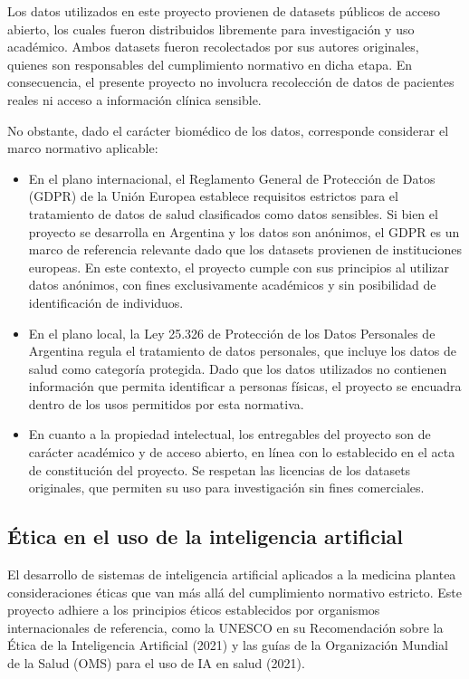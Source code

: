 \documentclass[
11pt, %
]{charter}
\begin{document}
Los datos utilizados en este proyecto provienen de datasets públicos de acceso abierto, los cuales fueron distribuidos libremente 
para investigación y uso académico. Ambos datasets fueron recolectados por sus autores originales, quienes son responsables del cumplimiento normativo en 
dicha etapa. En consecuencia, el presente proyecto no involucra recolección de datos de pacientes reales ni acceso a información 
clínica sensible.

No obstante, dado el carácter biomédico de los datos, corresponde considerar el marco normativo aplicable:
\begin{itemize}
  \item En el plano internacional, el Reglamento General de Protección de Datos (GDPR) de la Unión Europea establece requisitos estrictos 
        para el tratamiento de datos de salud clasificados como datos sensibles. Si bien el proyecto se desarrolla en Argentina y los datos son 
        anónimos, el GDPR es un marco de referencia relevante dado que los datasets provienen de instituciones europeas. 
        En este contexto, el proyecto cumple con sus principios al utilizar datos anónimos, con fines exclusivamente académicos y sin posibilidad 
        de identificación de individuos.
  \item En el plano local, la Ley 25.326 de Protección de los Datos Personales de Argentina regula el tratamiento de datos personales, 
        que incluye los datos de salud como categoría protegida. Dado que los datos utilizados no contienen información que permita 
        identificar a personas físicas, el proyecto se encuadra dentro de los usos permitidos por esta normativa.
  \item En cuanto a la propiedad intelectual, los entregables del proyecto son de carácter académico y de acceso abierto, en línea con lo establecido 
        en el acta de constitución del proyecto. Se respetan las licencias de los datasets originales, que permiten su uso para investigación sin 
        fines comerciales.
\end{itemize}

\subsection{Ética en el uso de la inteligencia artificial}

El desarrollo de sistemas de inteligencia artificial aplicados a la medicina plantea consideraciones éticas que van más allá del cumplimiento normativo estricto. 
Este proyecto adhiere a los principios éticos establecidos por organismos internacionales de referencia, como la UNESCO en su Recomendación 
sobre la Ética de la Inteligencia Artificial (2021) y las guías de la Organización Mundial de la Salud (OMS) para el uso de IA en salud (2021).
\end{document}
